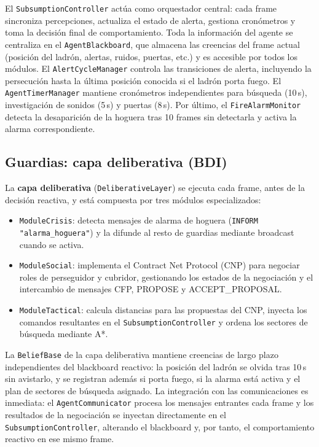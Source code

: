 \documentclass[a4paper,12pt]{article}
\begin{document}
El \texttt{SubsumptionController} actúa como orquestador central: cada frame 
sincroniza percepciones, actualiza el estado de alerta, gestiona cronómetros y 
toma la decisión final de comportamiento. Toda la información del agente se 
centraliza en el \texttt{AgentBlackboard}, que almacena las creencias del frame 
actual (posición del ladrón, alertas, ruidos, puertas, etc.) y es accesible por 
todos los módulos. El \texttt{AlertCycleManager} controla las transiciones de 
alerta, incluyendo la persecución hasta la última posición conocida si el ladrón 
porta fuego. El \texttt{AgentTimerManager} mantiene cronómetros independientes 
para búsqueda (10\,s), investigación de sonidos (5\,s) y puertas (8\,s). 
Por último, el \texttt{FireAlarmMonitor} detecta la desaparición de la hoguera 
tras 10 frames sin detectarla y activa la alarma correspondiente.


\subsection{Guardias: capa deliberativa (BDI)}



    La \textbf{capa deliberativa} (\texttt{DeliberativeLayer}) se ejecuta
    cada frame, antes de la decisión reactiva, y está compuesta por tres
    módulos especializados:
\begin{itemize}
    \item \texttt{ModuleCrisis}: detecta mensajes de alarma de hoguera 
    (\texttt{INFORM "alarma\_hoguera"}) y la difunde al resto de guardias 
    mediante broadcast cuando se activa.
    \item \texttt{ModuleSocial}: implementa el Contract Net Protocol (CNP) 
    para negociar roles de perseguidor y cubridor, gestionando los estados 
    de la negociación y el intercambio de mensajes CFP, PROPOSE y 
    ACCEPT\_PROPOSAL.
    \item \texttt{ModuleTactical}: calcula distancias para las propuestas del 
    CNP, inyecta los comandos resultantes en el \texttt{SubsumptionController} 
    y ordena los sectores de búsqueda mediante A*.
\end{itemize}

La \texttt{BeliefBase} de la capa deliberativa mantiene creencias de largo plazo 
independientes del blackboard reactivo: la posición del ladrón se olvida tras 
10\,s sin avistarlo, y se registran además si porta fuego, si la alarma está 
activa y el plan de sectores de búsqueda asignado. La integración con las 
comunicaciones es inmediata: el \texttt{AgentCommunicator} procesa los mensajes 
entrantes cada frame y los resultados de la negociación se inyectan directamente 
en el \texttt{SubsumptionController}, alterando el blackboard y, por tanto, el 
comportamiento reactivo en ese mismo frame.
\end{document}
